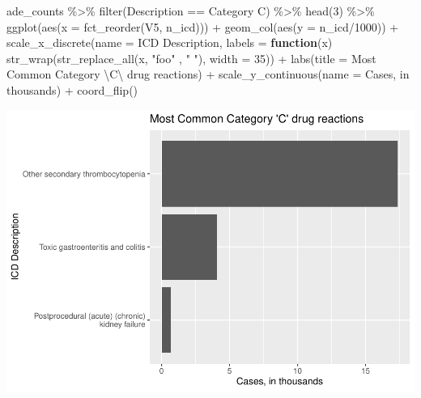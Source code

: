 \documentclass[preprint, 3p,
authoryear]{elsarticle} %
\newenvironment{Shaded}{\begin{snugshade}}{\end{snugshade}}
\newcommand{\AttributeTok}[1]{\textcolor[rgb]{0.77,0.63,0.00}{#1}}
\newcommand{\ControlFlowTok}[1]{\textcolor[rgb]{0.13,0.29,0.53}{\textbf{#1}}}
\newcommand{\DecValTok}[1]{\textcolor[rgb]{0.00,0.00,0.81}{#1}}
\newcommand{\FunctionTok}[1]{\textcolor[rgb]{0.00,0.00,0.00}{#1}}
\newcommand{\NormalTok}[1]{#1}
\newcommand{\SpecialCharTok}[1]{\textcolor[rgb]{0.00,0.00,0.00}{#1}}
\newcommand{\StringTok}[1]{\textcolor[rgb]{0.31,0.60,0.02}{#1}}
\begin{document}
\begin{Shaded}
\begin{Highlighting}[]
\NormalTok{ade\_counts }\SpecialCharTok{\%\textgreater{}\%}
  \FunctionTok{filter}\NormalTok{(Description }\SpecialCharTok{==} \StringTok{\textquotesingle{}Category C\textquotesingle{}}\NormalTok{) }\SpecialCharTok{\%\textgreater{}\%}
  \FunctionTok{head}\NormalTok{(}\DecValTok{3}\NormalTok{) }\SpecialCharTok{\%\textgreater{}\%}
  \FunctionTok{ggplot}\NormalTok{(}\FunctionTok{aes}\NormalTok{(}\AttributeTok{x =} \FunctionTok{fct\_reorder}\NormalTok{(V5, n\_icd))) }\SpecialCharTok{+}
  \FunctionTok{geom\_col}\NormalTok{(}\FunctionTok{aes}\NormalTok{(}\AttributeTok{y =}\NormalTok{ n\_icd}\SpecialCharTok{/}\DecValTok{1000}\NormalTok{)) }\SpecialCharTok{+} 
  \FunctionTok{scale\_x\_discrete}\NormalTok{(}\AttributeTok{name =} \StringTok{\textquotesingle{}ICD Description\textquotesingle{}}\NormalTok{, }\AttributeTok{labels =} \ControlFlowTok{function}\NormalTok{(x) }\FunctionTok{str\_wrap}\NormalTok{(}\FunctionTok{str\_replace\_all}\NormalTok{(x, }\StringTok{"foo"}\NormalTok{ , }\StringTok{" "}\NormalTok{),}
                                                 \AttributeTok{width =} \DecValTok{35}\NormalTok{)) }\SpecialCharTok{+}
  \FunctionTok{labs}\NormalTok{(}\AttributeTok{title =} \StringTok{\textquotesingle{}Most Common Category }\SpecialCharTok{\textbackslash{}\textquotesingle{}}\StringTok{C}\SpecialCharTok{\textbackslash{}\textquotesingle{}}\StringTok{ drug reactions\textquotesingle{}}\NormalTok{) }\SpecialCharTok{+}
  \FunctionTok{scale\_y\_continuous}\NormalTok{(}\AttributeTok{name =} \StringTok{\textquotesingle{}Cases, in thousands\textquotesingle{}}\NormalTok{) }\SpecialCharTok{+}
  \FunctionTok{coord\_flip}\NormalTok{() }
\end{Highlighting}
\end{Shaded}

\includegraphics{final-project-paper_files/figure-latex/ade-cat-c-1.pdf}
\end{document}
